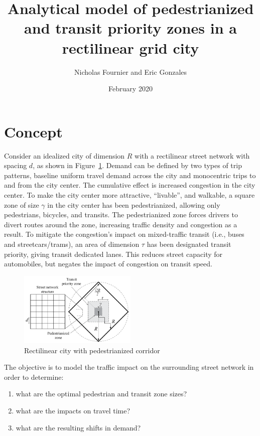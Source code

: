 \documentclass{article}
\title{Analytical model of pedestrianized and transit priority zones in a rectilinear grid city}
\author{Nicholas Fournier and Eric Gonzales}
\date{February 2020}
\begin{document}
\maketitle

\section{Concept}
Consider an idealized city of dimension $R$ with a rectilinear street network with spacing $d$, as shown in Figure~\ref{fig:gridcity}. Demand can be defined by two types of trip patterns, baseline uniform travel demand across the city and monocentric trips to and from the city center. The cumulative effect is increased congestion in the city center. To make the city center more attractive, ``livable'', and walkable, a square zone of size $\gamma$ in the city center has been pedestrianized, allowing only pedestrians, bicycles, and transits. The pedestrianized zone forces drivers to divert routes around the zone, increasing traffic density and congestion as a result. To mitigate the congestion's impact on mixed-traffic transit (i.e., buses and streetcars/trams), an area of dimension $\tau$ has been designated transit priority, giving transit dedicated lanes. This reduces street capacity for automobiles, but negates the impact of congestion on transit speed.

\begin{figure}[!ht]
     \centering
     \includegraphics[width=0.5\textwidth]{diagram_pedtransit_grid_city}
     \caption{Rectilinear city with pedestrianized corridor}
     \label{fig:gridcity}
\end{figure}

\noindent The objective is to model the traffic impact on the surrounding street network in order to determine:
\begin{enumerate}[topsep=3pt, itemsep=3pt, partopsep=3pt, parsep=3pt]
    \itshape
    \item what are the optimal pedestrian and transit zone sizes?
    \item what are the impacts on travel time?
    \item what are the resulting shifts in demand?
\end{enumerate}
\end{document}

